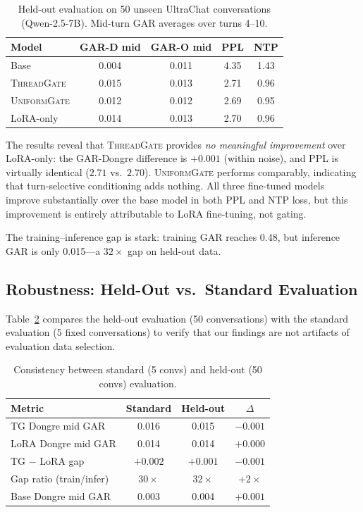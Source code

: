 \documentclass[11pt,a4paper]{article}
\newcommand{\gar}{\textsc{GAR}}
\newcommand{\tg}{\textsc{ThreadGate}}
\newcommand{\ug}{\textsc{UniformGate}}
\begin{document}
\begin{table}[H]
\centering
\caption{Held-out evaluation on 50 unseen UltraChat conversations (Qwen-2.5-7B). Mid-turn \gar{} averages over turns 4--10.}
\label{tab:heldout-eval}
\begin{tabular}{lcccc}
\toprule
\textbf{Model} & \textbf{GAR-D mid} & \textbf{GAR-O mid} & \textbf{PPL} & \textbf{NTP} \\
\midrule
Base       & 0.004 & 0.011 & 4.35 & 1.43 \\
\tg{}      & 0.015 & 0.013 & 2.71 & 0.96 \\
\ug{}      & 0.012 & 0.012 & 2.69 & 0.95 \\
LoRA-only  & 0.014 & 0.013 & 2.70 & 0.96 \\
\bottomrule
\end{tabular}
\end{table}

The results reveal that \tg{} provides \emph{no meaningful improvement} over LoRA-only: the \gar{}-Dongre difference is $+0.001$ (within noise), and PPL is virtually identical ($2.71$ vs.\ $2.70$).
\ug{} performs comparably, indicating that turn-selective conditioning adds nothing.
All three fine-tuned models improve substantially over the base model in both PPL and NTP loss, but this improvement is entirely attributable to LoRA fine-tuning, not gating.

The training--inference gap is stark: training \gar{} reaches 0.48, but inference \gar{} is only 0.015---a $32\times$ gap on held-out data.

\subsection{Robustness: Held-Out vs.\ Standard Evaluation}

Table~\ref{tab:heldout-consistency} compares the held-out evaluation (50 conversations) with the standard evaluation (5 fixed conversations) to verify that our findings are not artifacts of evaluation data selection.

\begin{table}[H]
\centering
\caption{Consistency between standard (5 convs) and held-out (50 convs) evaluation.}
\label{tab:heldout-consistency}
\begin{tabular}{lccc}
\toprule
\textbf{Metric} & \textbf{Standard} & \textbf{Held-out} & \textbf{$\Delta$} \\
\midrule
TG Dongre mid \gar{}     & 0.016 & 0.015 & $-0.001$ \\
LoRA Dongre mid \gar{}    & 0.014 & 0.014 & $+0.000$ \\
TG $-$ LoRA gap           & $+0.002$ & $+0.001$ & $-0.001$ \\
Gap ratio (train/infer)   & $30\times$ & $32\times$ & $+2\times$ \\
Base Dongre mid \gar{}    & 0.003 & 0.004 & $+0.001$ \\
\bottomrule
\end{tabular}
\end{table}
\end{document}
